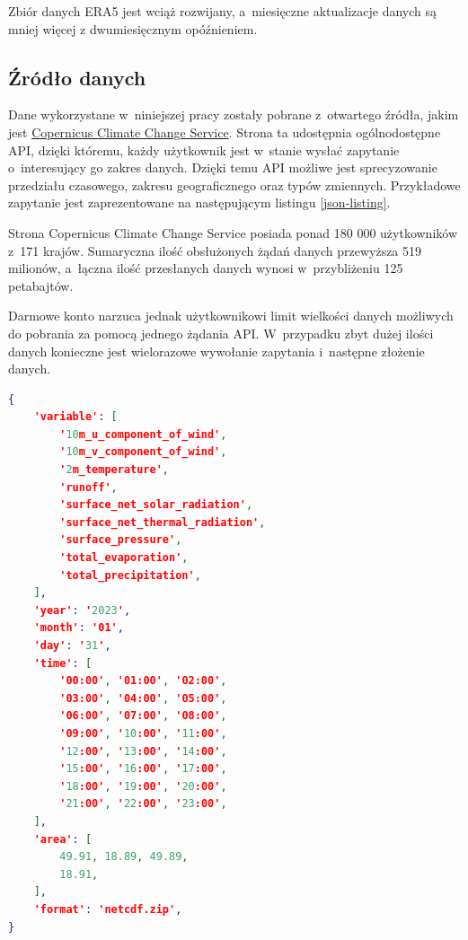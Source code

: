 Zbiór danych ERA5 jest wciąż rozwijany, a~miesięczne aktualizacje danych są mniej więcej
z dwumiesięcznym opóźnieniem.

\subsection{Źródło danych}

Dane wykorzystane w~niniejszej pracy zostały pobrane z~otwartego źródła, jakim jest
\href{https://cds.climate.copernicus.eu/cdsapp#!/dataset/reanalysis-era5-land?tab=form}{Copernicus Climate Change Service}.
Strona ta udostępnia ogólnodostępne API, dzięki któremu, każdy użytkownik jest w~stanie
wysłać zapytanie o~interesujący go zakres danych. Dzięki temu API możliwe jest sprecyzowanie
przedziału czasowego, zakresu geograficznego oraz typów zmiennych. Przykładowe zapytanie jest 
zaprezentowane na następującym listingu \ref{json-listing}.

Strona Copernicus Climate Change Service posiada ponad 180 000 użytkowników z~171 krajów. Sumaryczna
ilość obsłużonych żądań danych przewyższa 519 milionów, a~łączna ilość przesłanych danych wynosi
w~przybliżeniu 125 petabajtów.

Darmowe konto narzuca jednak użytkownikowi limit wielkości danych możliwych do pobrania 
za pomocą jednego żądania API. W~przypadku zbyt dużej ilości danych konieczne
jest wielorazowe wywołanie zapytania i~następne złożenie danych.

\begin{lstlisting}[label=json-listing,caption={Przykładowe zapytanie API CDS Climate Copernicus},language=json]
{
    'variable': [
        '10m_u_component_of_wind', 
        '10m_v_component_of_wind', 
        '2m_temperature',
        'runoff', 
        'surface_net_solar_radiation', 
        'surface_net_thermal_radiation',
        'surface_pressure', 
        'total_evaporation', 
        'total_precipitation',
    ],
    'year': '2023',
    'month': '01',
    'day': '31',
    'time': [
        '00:00', '01:00', '02:00',
        '03:00', '04:00', '05:00',
        '06:00', '07:00', '08:00',
        '09:00', '10:00', '11:00',
        '12:00', '13:00', '14:00',
        '15:00', '16:00', '17:00',
        '18:00', '19:00', '20:00',
        '21:00', '22:00', '23:00',
    ],
    'area': [
        49.91, 18.89, 49.89,
        18.91,
    ],
    'format': 'netcdf.zip',
}
\end{lstlisting}

